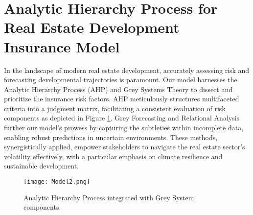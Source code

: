 \documentclass{mcmthesis}
\begin{document}
\section{Analytic Hierarchy Process for Real Estate Development Insurance Model}


    In the landscape of modern real estate development, accurately assessing risk and forecasting developmental trajectories is paramount. Our model harnesses the Analytic Hierarchy Process (AHP) and Grey Systems Theory to dissect and prioritize the insurance risk factors. AHP meticulously structures multifaceted criteria into a judgment matrix, facilitating a consistent evaluation of risk components as depicted in Figure \ref{fig:ahp_flow}. Grey Forecasting and Relational Analysis further our model's prowess by capturing the subtleties within incomplete data, enabling robust predictions in uncertain environments. These methods, synergistically applied, empower stakeholders to navigate the real estate sector's volatility effectively, with a particular emphasis on climate resilience and sustainable development.
    
    \begin{figure}[h]
    \centering
    \texttt{[image: Model2.png]}
    \caption{Analytic Hierarchy Process integrated with Grey System components.}
    \label{fig:ahp_flow}
    \end{figure}
\end{document}
